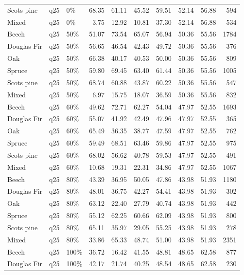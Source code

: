 \begin{longtable}{lllrrrrrrr}
  Scots pine & q25 & 0\% & 68.35 & 61.11 & 45.52 & 59.51 & 52.14 & 56.88 & 594 \\ 
  Mixed & q25 & 0\% & 3.75 & 12.92 & 10.81 & 37.30 & 52.14 & 56.88 & 534 \\ 
  Beech & q25 & 50\% & 51.07 & 73.54 & 65.07 & 56.94 & 50.36 & 55.56 & 1784 \\ 
  Douglas Fir & q25 & 50\% & 56.65 & 46.54 & 42.43 & 49.72 & 50.36 & 55.56 & 376 \\ 
  Oak & q25 & 50\% & 66.38 & 40.17 & 40.53 & 50.00 & 50.36 & 55.56 & 809 \\ 
  Spruce & q25 & 50\% & 59.80 & 69.45 & 63.40 & 61.44 & 50.36 & 55.56 & 1005 \\ 
  Scots pine & q25 & 50\% & 68.74 & 60.88 & 43.87 & 60.22 & 50.36 & 55.56 & 547 \\ 
  Mixed & q25 & 50\% & 6.97 & 15.75 & 18.07 & 36.59 & 50.36 & 55.56 & 832 \\ 
  Beech & q25 & 60\% & 49.62 & 72.71 & 62.27 & 54.04 & 47.97 & 52.55 & 1693 \\ 
  Douglas Fir & q25 & 60\% & 55.07 & 41.92 & 42.49 & 47.96 & 47.97 & 52.55 & 365 \\ 
  Oak & q25 & 60\% & 65.49 & 36.35 & 38.77 & 47.59 & 47.97 & 52.55 & 762 \\ 
  Spruce & q25 & 60\% & 59.49 & 68.51 & 63.46 & 59.86 & 47.97 & 52.55 & 975 \\ 
  Scots pine & q25 & 60\% & 68.02 & 56.62 & 40.78 & 59.53 & 47.97 & 52.55 & 491 \\ 
  Mixed & q25 & 60\% & 10.68 & 19.31 & 22.31 & 34.86 & 47.97 & 52.55 & 1067 \\ 
  Beech & q25 & 80\% & 43.39 & 36.95 & 50.05 & 47.86 & 43.98 & 51.93 & 1180 \\ 
  Douglas Fir & q25 & 80\% & 48.01 & 36.75 & 42.27 & 54.41 & 43.98 & 51.93 & 302 \\ 
  Oak & q25 & 80\% & 63.12 & 22.40 & 27.79 & 40.74 & 43.98 & 51.93 & 442 \\ 
  Spruce & q25 & 80\% & 55.12 & 62.25 & 60.66 & 62.09 & 43.98 & 51.93 & 800 \\ 
  Scots pine & q25 & 80\% & 65.11 & 35.97 & 29.05 & 55.25 & 43.98 & 51.93 & 278 \\ 
  Mixed & q25 & 80\% & 33.86 & 65.33 & 48.74 & 51.00 & 43.98 & 51.93 & 2351 \\ 
  Beech & q25 & 100\% & 36.72 & 16.42 & 41.55 & 48.81 & 48.65 & 62.58 & 877 \\ 
  Douglas Fir & q25 & 100\% & 42.17 & 21.74 & 40.25 & 48.54 & 48.65 & 62.58 & 230 \\ 

\end{longtable}
